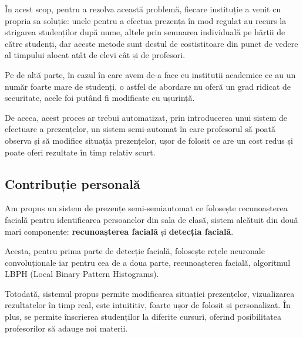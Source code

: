 \documentclass[a4paper, 12pt]{article}
\begin{document}
	În acest scop, pentru a rezolva această problemă, fiecare instituție a venit cu propria sa soluție: unele pentru a efectua prezența în mod regulat au recurs la  strigarea studenților după nume, altele prin semnarea individuală pe hârtii de către studenți, dar aceste metode sunt destul de costistitoare din punct de vedere al timpului alocat atât de elevi cât și de profesori.
	
	Pe de altă parte, în cazul în care avem de-a face cu instituții academice ce au un număr foarte mare de studenți, o astfel de abordare nu oferă un grad ridicat de securitate, acele foi putând fi modificate cu ușurință.
	
	De accea, acest proces ar trebui automatizat, prin introducerea unui sistem de efectuare a prezențelor, un sistem semi-automat în care profesorul să poată observa și să modifice situația prezențelor, ușor de folosit ce are un cost redus și poate oferi rezultate în timp relativ scurt.
	
	\bigskip
	\subsection{Contribuție personală}
	\quad\space Am propus un sistem de prezențe semi-semiautomat ce folosește recunoașterea facială pentru identificarea persoanelor din sala de clasă, sistem alcătuit din două mari componente: \textbf{recunoașterea facială} și \textbf{detecția facială}.
	
	Acesta, pentru prima parte de detecție facială, folosește rețele neuronale convoluționale iar pentru cea de a doua parte, recunoașterea facială, algoritmul LBPH (Local Binary Pattern Histograms).
	
	Totodată, sistemul propus permite modificarea situației prezențelor, vizualizarea rezultatelor în timp real, este intuititiv, foarte ușor de folosit și personalizat. În plus, se permite înscrierea studenților la diferite cursuri, oferind posibilitatea profesorilor să adauge noi materii.
	\bigskip
\end{document}
